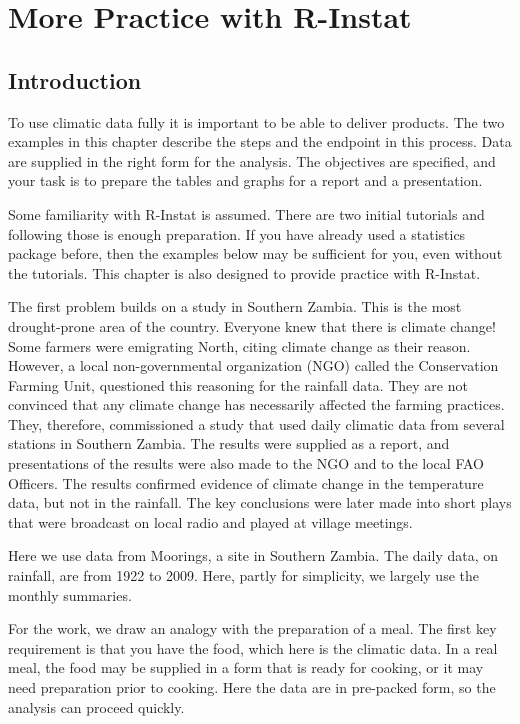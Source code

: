 \documentclass[
  letterpaper,
  DIV=11,
  numbers=noendperiod]{scrreprt}
\begin{document}

\chapter{More Practice with R-Instat}\label{more-practice-with-r-instat}

\section{Introduction}\label{introduction}

To use climatic data fully it is important to be able to deliver
products. The two examples in this chapter describe the steps and the
endpoint in this process. Data are supplied in the right form for the
analysis. The objectives are specified, and your task is to prepare the
tables and graphs for a report and a presentation.

Some familiarity with R-Instat is assumed. There are two initial
tutorials and following those is enough preparation. If you have already
used a statistics package before, then the examples below may be
sufficient for you, even without the tutorials. This chapter is also
designed to provide practice with R-Instat.

The first problem builds on a study in Southern Zambia. This is the most
drought-prone area of the country. Everyone knew that there is
\textquotesingle climate change\textquotesingle! Some farmers were
emigrating North, citing climate change as their reason. However, a
local non-governmental organization (NGO) called the Conservation
Farming Unit, questioned this reasoning for the rainfall data. They are
not convinced that any climate change has necessarily affected the
farming practices. They, therefore, commissioned a study that used daily
climatic data from several stations in Southern Zambia. The results were
supplied as a report, and presentations of the results were also made to
the NGO and to the local FAO Officers. The results confirmed evidence of
climate change in the temperature data, but not in the rainfall. The key
conclusions were later made into short plays that were broadcast on
local radio and played at village meetings.

Here we use data from Moorings, a site in Southern Zambia. The daily
data, on rainfall, are from 1922 to 2009. Here, partly for simplicity,
we largely use the monthly summaries.

For the work, we draw an analogy with the preparation of a meal. The
first key requirement is that you have the food, which here is the
climatic data. In a real meal, the food may be supplied in a form that
is ready for cooking, or it may need preparation prior to cooking. Here
the data are in pre-packed form, so the analysis can proceed quickly.
\end{document}

